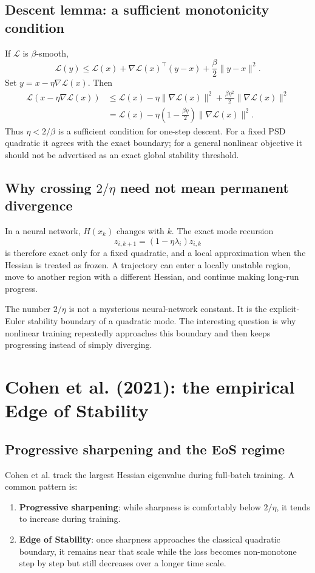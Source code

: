 \documentclass[11pt,a4paper,oneside,openany]{memoir}
\theoremstyle{definition}
\begin{document}
\section{Descent lemma: a sufficient monotonicity condition}
If $\mathcal L$ is $\beta$-smooth,
\[
\mathcal L(y)\le \mathcal L(x)+\nabla\mathcal L(x)^\top(y-x)+\frac\beta2\|y-x\|^2.
\]
Set $y=x-\eta\nabla\mathcal L(x)$.  Then
\begin{align*}
\mathcal L(x-\eta\nabla\mathcal L(x))
&\le \mathcal L(x)-\eta\|\nabla\mathcal L(x)\|^2
+\frac{\beta\eta^2}{2}\|\nabla\mathcal L(x)\|^2\\
&=\mathcal L(x)-\eta\left(1-\frac{\beta\eta}{2}\right)
\|\nabla\mathcal L(x)\|^2.
\end{align*}
Thus $\eta<2/\beta$ is a sufficient condition for one-step descent.  For a fixed PSD quadratic it agrees with the exact boundary; for a general nonlinear objective it should not be advertised as an exact global stability threshold.

\section{Why crossing $2/\eta$ need not mean permanent divergence}
In a neural network, $H(x_k)$ changes with $k$.  The exact mode recursion
\[
z_{i,k+1}=(1-\eta\lambda_i)z_{i,k}
\]
is therefore exact only for a fixed quadratic, and a local approximation when the Hessian is treated as frozen.  A trajectory can enter a locally unstable region, move to another region with a different Hessian, and continue making long-run progress.

\begin{presentbox}
The number $2/\eta$ is not a mysterious neural-network constant.  It is the explicit-Euler stability boundary of a quadratic mode.  The interesting question is why nonlinear training repeatedly approaches this boundary and then keeps progressing instead of simply diverging.
\end{presentbox}

\chapter{Cohen et al. (2021): the empirical Edge of Stability}

\section{Progressive sharpening and the EoS regime}
Cohen et al. track the largest Hessian eigenvalue during full-batch training.  A common pattern is:
\begin{enumerate}
\item \textbf{Progressive sharpening}: while sharpness is comfortably below $2/\eta$, it tends to increase during training.
\item \textbf{Edge of Stability}: once sharpness approaches the classical quadratic boundary, it remains near that scale while the loss becomes non-monotone step by step but still decreases over a longer time scale.
\end{enumerate}
\end{document}
